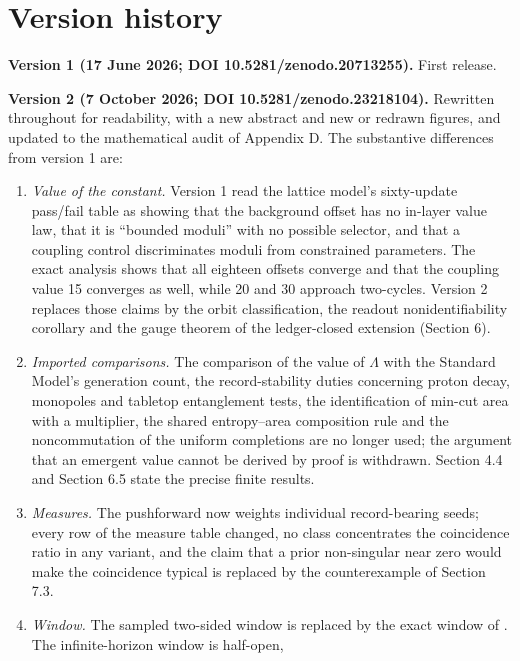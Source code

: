 \hypertarget{appendix-e-version-history}{%
\section{Version
history}\label{appendix-e-version-history}}

\textbf{Version 1 (17 June 2026; DOI 10.5281/zenodo.20713255).} First
release.

\textbf{Version 2 (7 October 2026; DOI 10.5281/zenodo.23218104).}
Rewritten throughout for readability, with a new abstract and new or
redrawn figures, and updated to the mathematical audit of Appendix D.
The substantive differences from version 1 are:

\begin{enumerate}
\def\labelenumi{\arabic{enumi}.}
\tightlist
\item
  \emph{Value of the constant.} Version 1 read the lattice model's
  sixty-update pass/fail table as showing that the background offset has
  no in-layer value law, that it is ``bounded moduli'' with no possible
  selector, and that a coupling control discriminates moduli from
  constrained parameters. The exact analysis shows that all eighteen
  offsets converge and that the coupling value 15 converges as well,
  while 20 and 30 approach two-cycles. Version 2 replaces those claims
  by the orbit classification, the readout nonidentifiability corollary
  and the gauge theorem of the ledger-closed extension (Section 6).
\item
  \emph{Imported comparisons.} The comparison of the value of
  \(\Lambda\) with the Standard Model's generation count, the
  record-stability duties concerning proton decay, monopoles and
  tabletop entanglement tests, the identification of min-cut area with a
  multiplier, the shared entropy--area composition rule and the
  noncommutation of the uniform completions are no longer used; the
  argument that an emergent value cannot be derived by proof is
  withdrawn. Section 4.4 and Section 6.5 state the precise finite
  results.
\item
  \emph{Measures.} The pushforward now weights individual record-bearing
  seeds; every row of the measure table changed, no class concentrates
  the coincidence ratio in any variant, and the claim that a prior
  non-singular near zero would make the coincidence typical is replaced
  by the counterexample of Section 7.3.
\item
  \emph{Window.} The sampled two-sided window is replaced by the exact
  window of . The infinite-horizon window is half-open,

\end{enumerate}
